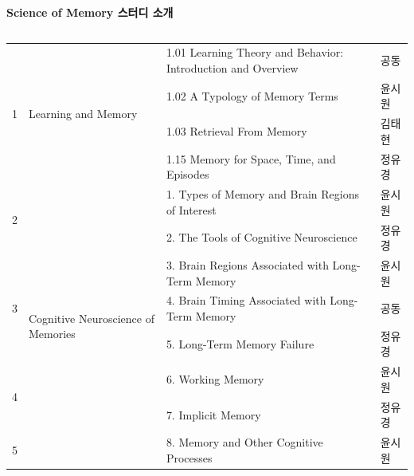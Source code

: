 \documentclass{beamer}
\begin{document}
\begin{frame}{\textbf{Science of Memory 스터디 소개}}
\begin{columns}
\begin{column}{0.6\textwidth}
\begin{table}[]
\begin{tabularx}{\textwidth}{|c|p{1cm}|X|l|}
      \multirow{4}{*}{1} & \multirow{4}{*}{\parbox[c]{1cm}{Learning and Memory}}                 & 1.01 Learning Theory and Behavior: Introduction and Overview & 공동           \\ \cline{3-4} 
                         &                                                      & 1.02 A Typology of Memory Terms                              & 윤시원          \\ \cline{3-4} 
                         &                                                      & 1.03 Retrieval From Memory                                   & 김태현          \\ \cline{3-4} 
                         &                                                      & 1.15 Memory for Space, Time, and Episodes                    & 정유경          \\ \hline
      \multirow{2}{*}{2} & \multirow{11}{*}{\parbox[c]{1.1cm}{Cognitive Neuroscience of Memories}} & 1. Types of Memory and Brain Regions of Interest             & 윤시원          \\ \cline{3-4} 
                         &                                                      & 2. The Tools of Cognitive Neuroscience                       & 정유경          \\ \cline{1-1} \cline{3-4} 
      \multirow{3}{*}{3} &                                                      & 3. Brain Regions Associated with Long-Term Memory            & 윤시원          \\ \cline{3-4} 
                         &                                                      & 4. Brain Timing Associated with Long-Term Memory             & 공동           \\ \cline{3-4} 
                         &                                                      & 5. Long-Term Memory Failure                                  & 정유경          \\ \cline{1-1} \cline{3-4} 
      \multirow{2}{*}{4} &                                                      & 6. Working Memory                                            & 윤시원          \\ \cline{3-4} 
                         &                                                      & 7. Implicit Memory                                           & 정유경          \\ \cline{1-1} \cline{3-4} 
      \multirow{2}{*}{5} &                                                      & 8. Memory and Other Cognitive Processes                      & 윤시원          \\ \cline{3-4} 

\end{tabularx}
\end{table}
\end{column}
\end{columns}
\end{frame}
\end{document}
